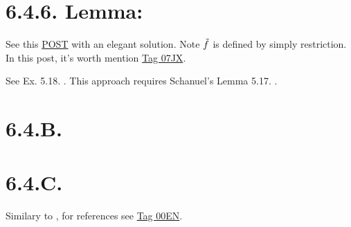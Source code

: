 \section{6.4.6. Lemma:}

See this \href{https://mathoverflow.net/questions/1788/does-finitely-presented-mean-always-finitely-presented-answered-yes}{POST} with an elegant solution. Note $\Tilde f$ is defined by simply restriction. In this post, it's worth mention \href{https://stacks.math.columbia.edu/tag/07JX}{Tag 07JX}.

See Ex. 5.18. \cite{altman2013term}. This approach requires Schanuel’s Lemma 5.17. \cite{altman2013term}.

\section{6.4.B.}\label{6.4.B.}

\section{6.4.C.}

Similary to , for references see \href{https://stacks.math.columbia.edu/tag/00EN}{Tag 00EN}.